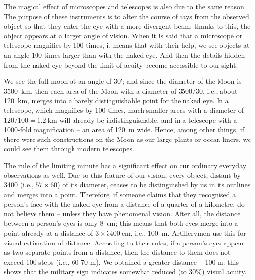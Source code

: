 The magical effect of microscopes and telescopes is also due to the same reason. The purpose of these instruments is to alter the course of rays from the observed object so that they enter the eye with a more divergent beam; thanks to this, the object appears at a larger angle of vision. When it is said that a microscope or telescope magnifies by 100 times, it means that with their help, we see objects at an angle 100 times larger than with the naked eye. And then the details hidden from the naked eye beyond the limit of acuity become accessible to our sight. 

We see the full moon at an angle of \ang{;30}; and since the diameter of the Moon is \SI{3500}{\kilo\meter}, then each area of the Moon with a diameter of $3500/30$, i.e., about \SI{120}{\kilo\meter}, merges into a barely distinguishable point for the naked eye. In a telescope, which magnifies by 100 times, much smaller areas with a diameter of $120/100 = \SI{1.2}{\kilo\meter}$ will already be indistinguishable, and in a telescope with a 1000-fold magnification -- an area of \SI{120}{\meter} wide. Hence, among other things, if there were such constructions on the Moon as our large plants or ocean liners, we could see them through modern telescopes.

The rule of the limiting minute has a significant effect on our ordinary everyday observations as well. Due to this feature of our vision, every object, distant by 3400 (i.e., $57 \times 60$) of its diameter, ceases to be distinguished by us in its outlines and merges into a point. Therefore, if someone claims that they recognised a person's face with the naked eye from a distance of a quarter of a kilometre, do not believe them -- unless they have phenomenal vision. After all, the distance between a person's eyes is only \SI{8}{\centi\meter}; this means that both eyes merge into a point already at a distance of $3 \times \SI{3400}{\centi\meter}$, i.e., \SI{100}{\meter}. Artillerymen use this for visual estimation of distance. According to their rules, if a person's eyes appear as two separate points from a distance, then the distance to them does not exceed 100 steps (i.e., 60-70 m). We obtained a greater distance -- 100 m: this shows that the military sign indicates somewhat reduced (to 30\%) visual acuity.

